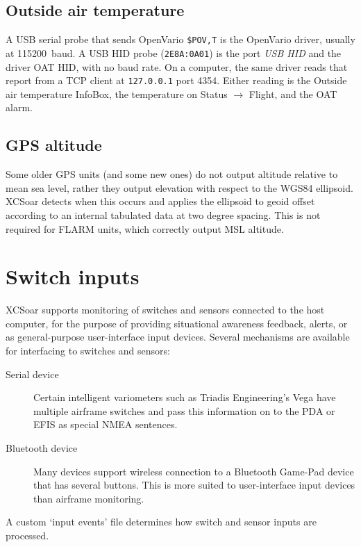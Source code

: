 \subsection*{Outside air temperature}

A USB serial probe that sends OpenVario \texttt{\$POV,T} is the
OpenVario driver, usually at 115200~baud.  A USB HID probe
(\texttt{2E8A:0A01}) is the port {\it USB HID} and the driver
OAT HID, with no baud rate.  On a computer, the same driver reads
that report from a TCP client at \texttt{127.0.0.1} port 4354.
Either reading is the Outside air
temperature InfoBox, the temperature on Status $\rightarrow$ Flight,
and the OAT alarm.

\subsection*{GPS altitude}

Some older GPS units (and some new ones) do not output altitude
relative to mean sea level, rather they output elevation with respect
to the WGS84 ellipsoid.  XCSoar detects when this occurs and applies
the ellipsoid to geoid offset according to an internal tabulated data
at two degree spacing.  This is not required for FLARM units,
which correctly output MSL altitude.

\section{Switch inputs}

XCSoar supports monitoring of switches and sensors connected to the
host computer, for the purpose of providing situational awareness
feedback, alerts, or as general-purpose user-interface input devices.
Several mechanisms are available for interfacing to switches and
sensors:
\begin{description}
\item[Serial device]  Certain intelligent variometers such as
 Triadis Engineering's Vega have multiple airframe switches
 and pass this information on to the PDA or EFIS as special
 NMEA sentences.
\item[Bluetooth device]  Many devices support wireless
 connection to a Bluetooth Game-Pad device that has several buttons.
 This is more suited to user-interface input devices than airframe
 monitoring.
\end{description}

A custom `input events' file determines how switch and sensor
inputs are processed.

